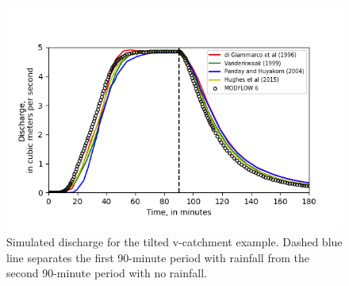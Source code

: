 \documentclass[fleqn]{article}
\begin{document}
\begin{figure}
	\centering
	\includegraphics[scale=0.75]{figures/vcatch-results.png}
	\caption[Simulated discharge for the tilted v-catchment example.]{Simulated discharge for the tilted v-catchment example.  Dashed blue line separates the first 90-minute period with rainfall from the second 90-minute period with no rainfall.}
	\label{fig:vcatch}
\end{figure}


 
\end{document}

